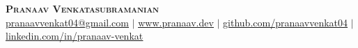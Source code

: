 \begin{center}
    \textbf{\Huge \scshape Pranaav Venkatasubramanian}\\ \vspace{1pt}
    \href{mailto:pranaavvenkat04@gmail.com}{pranaavvenkat04@gmail.com} \hspace{-3pt}
    $|$ \hspace{-3pt}
    \href{https://www.pranaav.dev}{\underline{www.pranaav.dev}} \hspace{-3pt}
    $|$ \hspace{-3pt}
    \href{https://github.com/pranaavvenkat04}{\underline{github.com/pranaavvenkat04}}\hspace{-3pt}
    $|$ \href{https://www.linkedin.com/in/pranaav-venkat}{\underline{linkedin.com/in/pranaav-venkat}}
\end{center}